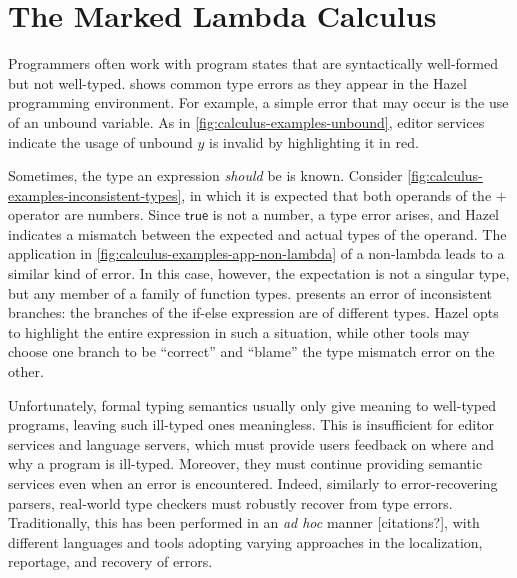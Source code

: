 
\section{The Marked Lambda Calculus}
\label{sec:calculus}

Programmers often work with program states that are syntactically well-formed but not well-typed.
 shows common type errors as they appear in the Hazel programming
environment. For example, a simple error that may occur is the use of an unbound variable. As in
\cref{fig:calculus-examples-unbound}, editor services indicate the usage of unbound $y$ is invalid
by highlighting it in red.



Sometimes, the type an expression \emph{should} be is known. Consider
\cref{fig:calculus-examples-inconsistent-types}, in which it is expected that both operands of the
$+$ operator are numbers. Since $\textsf{true}$ is not a number, a type error arises, and Hazel
indicates a mismatch between the expected and actual types of the operand. The application in
\cref{fig:calculus-examples-app-non-lambda} of a non-lambda leads to a similar kind of error. In
this case, however, the expectation is not a singular type, but any member of a family of function
types.  presents an error of inconsistent
branches: the branches of the if-else expression are of different types. Hazel opts to highlight the
entire expression in such a situation, while other tools may choose one branch to be ``correct'' and
``blame'' the type mismatch error on the other.


Unfortunately, formal typing semantics usually only give meaning to well-typed programs, leaving
such ill-typed ones meaningless. This is insufficient for editor services and language servers,
which must provide users feedback on where and why a program is ill-typed. Moreover, they must
continue providing semantic services even when an error is encountered. Indeed, similarly to
error-recovering parsers, real-world type checkers must robustly recover from type errors.
Traditionally, this has been performed in an \emph{ad hoc} manner [citations?], with different
languages and tools adopting varying approaches in the localization, reportage, and recovery of
errors.

